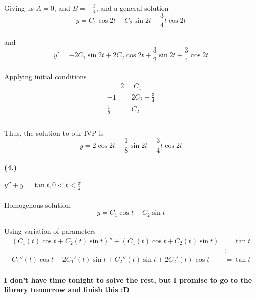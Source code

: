 \documentclass{article}
\begin{document}
\paragraph{}Giving us $A = 0$, and $B = -\frac{3}{4}$, and a general solution
\[
    y = C_1\cos2t + C_2 \sin2t -\frac{3}{4}t\cos2t
\]
\paragraph{}and
\[
    y' = -2C_1 \sin2t + 2C_2\cos2t + \frac{3}{2}\sin2t + \frac{3}{4}\cos2t
\]
\paragraph{}Applying initial conditions
\begin{align*}
    2 = C_1
\end{align*}
\begin{align*}
    -1 &= 2C_2 + \frac{3}{4}\\
    \frac{1}{8} &= C_2\\
\end{align*}

\paragraph{}Thus, the solution to our IVP is
\[
    y = 2\cos2t -\frac{1}{8}\sin2t -\frac{3}{4}t\cos2t 
\]
\paragraph{(4.)} $y''+y=\tan t, 0<t<\frac{\pi}{2}$
\paragraph{}Homogenous solution:
\[
  y = C_1 \cos t +C_2 \sin t 
\]
\paragraph{}Using variation of parameters
\begin{align*}
    ( C_1(t)\cos t +C_2(t)\sin t)'' + ( C_1(t)\cos t +C_2(t)\sin t) &= \tan t\\
                                                                    &\vdots \\
        C_1''(t)\cos t -2C_1'(t)\sin t +C_2''(t)\sin t + 2C_2'(t)\cos t &= \tan t
\end{align*}
\paragraph{I don't have time tonight to solve the rest, but I promise to go to the library tomorrow and finish this
:D}
\end{document}
